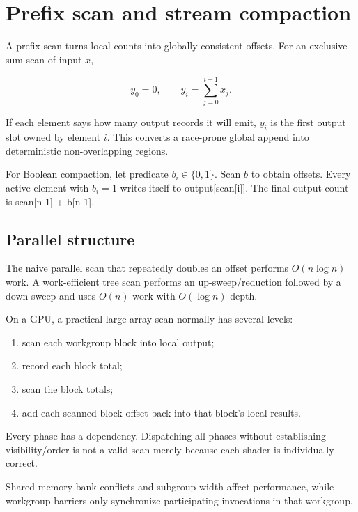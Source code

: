 \hypertarget{appendix-f2ee4d086415}{}
\section{Prefix scan and stream compaction}\label{appendix-f2ee4d086415-prefix-scan-and-stream-compaction}

A prefix scan turns local counts into globally consistent offsets. For an exclusive sum scan of input \(x\),

\[
y_0=0,
\qquad
y_i=\sum_{j=0}^{i-1}x_j.
\]

If each element says how many output records it will emit, \(y_i\) is the first output slot owned by element \(i\). This converts a race-prone global append into deterministic non-overlapping regions.

For Boolean compaction, let predicate \(b_i\in\{0,1\}\). Scan \(b\) to obtain offsets. Every active element with \(b_i=1\) writes itself to output{[}scan{[}i{]}{]}. The final output count is scan{[}n-1{]} + b{[}n-1{]}.

\subsection{Parallel structure}\label{appendix-f2ee4d086415-parallel-structure}

The naive parallel scan that repeatedly doubles an offset performs \(O(n\log n)\) work. A work-efficient tree scan performs an up-sweep/reduction followed by a down-sweep and uses \(O(n)\) work with \(O(\log n)\) depth.

On a GPU, a practical large-array scan normally has several levels:

\begin{enumerate}
\def\labelenumi{\arabic{enumi}.}
\tightlist
\item
  scan each workgroup block into local output;
\item
  record each block total;
\item
  scan the block totals;
\item
  add each scanned block offset back into that block's local results.
\end{enumerate}

Every phase has a dependency. Dispatching all phases without establishing visibility/order is not a valid scan merely because each shader is individually correct.

Shared-memory bank conflicts and subgroup width affect performance, while workgroup barriers only synchronize participating invocations in that workgroup.

